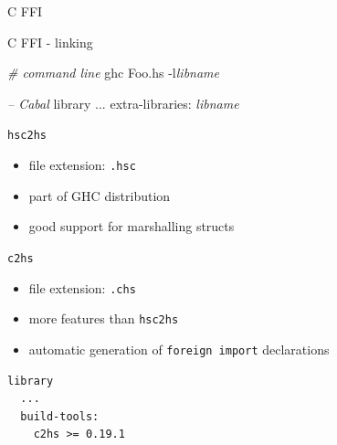 \documentclass[ignorenonframetext,aspectratio=169]{beamer}
\newenvironment{Shaded}{}{}
\newcommand{\KeywordTok}[1]{\textcolor[rgb]{0.00,0.44,0.13}{\textbf{{#1}}}}
\newcommand{\DataTypeTok}[1]{\textcolor[rgb]{0.56,0.13,0.00}{{#1}}}
\newcommand{\FloatTok}[1]{\textcolor[rgb]{0.25,0.63,0.44}{{#1}}}
\newcommand{\CommentTok}[1]{\textcolor[rgb]{0.38,0.63,0.69}{\textit{{#1}}}}
\newcommand{\OtherTok}[1]{\textcolor[rgb]{0.00,0.44,0.13}{{#1}}}
\newcommand{\FunctionTok}[1]{\textcolor[rgb]{0.02,0.16,0.49}{{#1}}}
\newcommand{\NormalTok}[1]{{#1}}
\providecommand{\tightlist}{%
  \setlength{\itemsep}{0pt}\setlength{\parskip}{0pt}}
\begin{document}
\begin{frame}[fragile]{C FFI}

\begin{Shaded}
\end{Shaded}

\end{frame}

\begin{frame}[fragile]{C FFI - linking}

\begin{Shaded}
\begin{Highlighting}[]
  \CommentTok{# command line}
  ghc Foo.hs -l\emph{libname}


  \CommentTok{-- Cabal}
  library
    ...
    extra-libraries:
      {\em libname}
\end{Highlighting}
\end{Shaded}

\end{frame}

\begin{frame}[fragile]{\tt hsc2hs}

\begin{itemize}
\tightlist
\item
  file extension: \texttt{.hsc}
\item
  part of GHC distribution
\item
  good support for marshalling structs
\end{itemize}

\end{frame}

\begin{frame}[fragile]{\tt c2hs}

\begin{itemize}
\tightlist
\item
  file extension: \texttt{.chs}
\item
  more features than \texttt{hsc2hs}
\item
  automatic generation of \texttt{foreign\ import} declarations
\end{itemize}

\begin{verbatim}
library
  ...
  build-tools:
    c2hs >= 0.19.1
\end{verbatim}

\end{frame}
\end{document}
